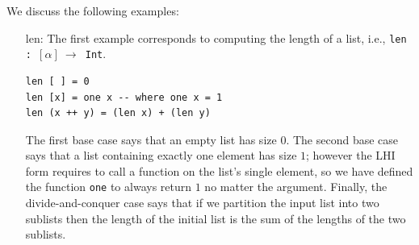 \documentclass[acmsmall,review]{acmart}\settopmatter{printfolios=true,printccs=false,printacmref=false}
\begin{document}
We discuss the following examples:
\begin{itemize}
\item[len:] The first example corresponds to computing the
                length of a list, i.e., 
                {\tt len : $[\alpha] ~\rightarrow$ Int}.
\begin{lstlisting}[mathescape=true]
len [ ] = 0
len [x] = one x -- where one x = 1
len (x ++ y) = (len x) + (len y)
\end{lstlisting}\vspace{-2ex}
            The first base case says that an empty list has size $0$.
            The second base case says that a list containing exactly
            one element has size $1$; however the LHI form requires
            to call a function on the list's single element, so we
            have defined the function \lstinline{one} to always return $1$
            no matter the argument.
            Finally, the divide-and-conquer case says that if we
            partition the input list into two sublists then the length
            of the initial list is the sum of the lengths of the
            two sublists.\medskip


\end{itemize}
\end{document}
